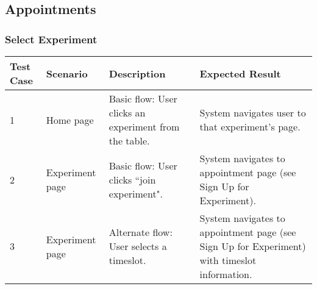 \begin{landscape}
\subsection{Appointments}
\subsubsection{Select Experiment}
\begin{table}[!h]
    \begin{tabular}{|l|l|p{2.5in}|p{2.5in}|}
        \hline
        Test Case & Scenario & Description & Expected Result \\ \hline
        1 & Home page & Basic flow: User clicks an experiment from the table. & System navigates user to that experiment's page. \\ \hline
        2 & Experiment page & Basic flow: User clicks ``join experiment". & System navigates to appointment page (see Sign Up for Experiment). \\ \hline
        3 & Experiment page & Alternate flow: User selects a timeslot. & System navigates to appointment page (see Sign Up for Experiment) with timeslot information. \\ \hline
    \end{tabular}
\end{table}


\end{landscape}

